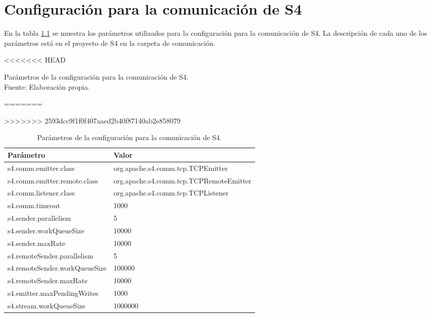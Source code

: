 \chapter{Configuraci\'on para la comunicaci\'on de S4}
\label{apendice:config-comm-S4}

En la tabla \ref{tab:config-comm-s4} se muestra los par\'ametros utilizados para la configuraci\'on para la comunicaci\'on de S4. La descripci\'on de cada uno de los par\'ametros est\'a en el proyecto de S4 en la carpeta de comunicaci\'on.

\begin{table}[!ht]
\centering
<<<<<<< HEAD
\captionsetup{justification=centering}
\caption[Parámetros de la configuración para la comunicación de S4.]{Parámetros de la configuración para la comunicación de S4.\\Fuente: Elaboración propia.}
=======
\caption{Par\'ametros de la configuraci\'on para la comunicaci\'on de S4.}
>>>>>>> 2593dcc9f1f0f407aaed2b40f87140ab2e858079
\begin{tabular}{|l|l|}
\hline
Par\'ametro & Valor \\ \hline
s4.comm.emitter.class & org.apache.s4.comm.tcp.TCPEmitter \\
s4.comm.emitter.remote.class & org.apache.s4.comm.tcp.TCPRemoteEmitter \\
s4.comm.listener.class & org.apache.s4.comm.tcp.TCPListener \\
s4.comm.timeout & 1000 \\
s4.sender.parallelism & 5 \\
s4.sender.workQueueSize & 10000 \\
s4.sender.maxRate & 10000 \\
s4.remoteSender.parallelism & 5 \\
s4.remoteSender.workQueueSize & 100000 \\
s4.remoteSender.maxRate & 10000 \\
s4.emitter.maxPendingWrites & 1000 \\
s4.stream.workQueueSize & 1000000 \\ \hline
\end{tabular}
\label{tab:config-comm-s4}
\end{table}